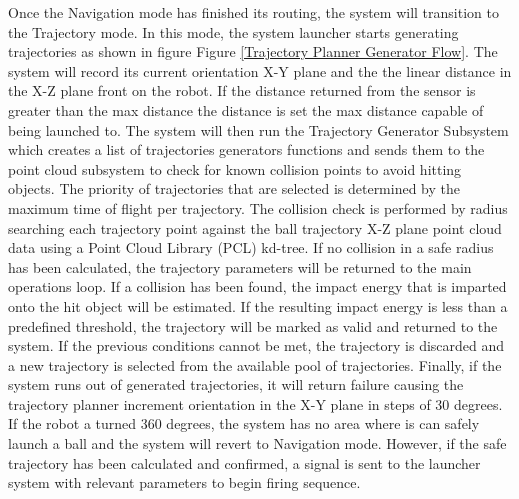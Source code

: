 \documentclass[11pt]{article}
\begin{document}
Once the Navigation mode has finished its routing, the system will transition to the Trajectory mode. In this mode, the system launcher starts generating trajectories as shown in figure Figure \ref{Trajectory Planner Generator Flow}. The system will record its current orientation X-Y plane and the the linear distance in the X-Z plane front on the robot. If the distance returned from the sensor is greater than the max distance the distance is set the max distance capable of being launched to. The system will then run the Trajectory Generator Subsystem which creates a list of trajectories generators functions and sends them to the point cloud subsystem to check for known collision points to avoid hitting objects. The priority of trajectories that are selected is determined by the maximum time of flight per trajectory. The collision check is performed by radius searching each trajectory point against the ball trajectory X-Z plane point cloud data using a Point Cloud Library (PCL) kd-tree. If no collision in a safe radius has been calculated, the trajectory parameters will be returned to the main operations loop. If a collision has been found, the impact energy that is imparted onto the hit object will be estimated. If the resulting impact energy is less than a predefined threshold, the trajectory will be marked as valid and returned to the system. If the previous conditions cannot be met, the trajectory is discarded and a new trajectory is selected from the available pool of trajectories. Finally, if the system runs out of generated trajectories, it will return failure causing the trajectory planner increment orientation in the X-Y plane in steps of 30 degrees. If the robot a turned 360 degrees, the system has no area where is can safely launch a ball and the system will revert to Navigation mode. However, if the safe trajectory has been calculated and confirmed, a signal is sent to the launcher system with relevant parameters to begin firing sequence.
\end{document}
